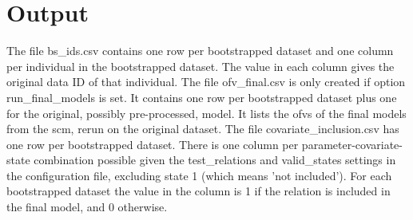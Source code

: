 \section{Output}

The file bs\_ids.csv contains one row per bootstrapped dataset and one column per individual in the bootstrapped dataset. 
The value in each column gives the original data ID of that individual.
The file ofv\_final.csv is only created if option run\_final\_models is set. It contains one row per bootstrapped dataset plus one for the original, 
possibly pre-processed, model. It lists the ofvs of the final models from the scm, rerun on the original dataset.
The file covariate\_inclusion.csv has one row per bootstrapped dataset. There is one column per parameter-covariate-state combination possible given 
the test\_relations and valid\_states settings in the configuration file, excluding state 1 (which means 'not included'). 
For each bootstrapped dataset the value in the column is 1 if the relation is included in the final model, and 0 otherwise.


